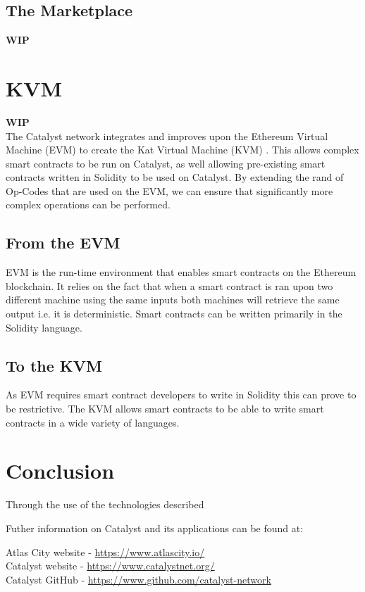 \documentclass{article}
\begin{document}
\subsection{The Marketplace}

\textbf{WIP} \\



\section{KVM}

\textbf{WIP} \\

The Catalyst network integrates and improves upon the Ethereum Virtual Machine (EVM) to create the Kat Virtual Machine (KVM) \cite{KVM}. This allows complex smart contracts to be run on Catalyst, as well allowing pre-existing smart contracts written in Solidity to be used on Catalyst. By extending the rand of Op-Codes that are used on the EVM, we can ensure that significantly more complex operations can be performed.

\subsection{From the EVM}

EVM is the run-time environment that enables smart contracts on the Ethereum blockchain. It relies on the fact that when a smart contract is ran upon two different machine using the same inputs both machines will retrieve the same output i.e. it is deterministic. Smart contracts can be written primarily in the Solidity language.

\subsection{To the KVM}

As EVM requires smart contract developers to write in Solidity this can prove to be restrictive. The KVM allows smart contracts to be able to write smart contracts in a wide variety of languages. 






\section*{Conclusion}

Through the use of the technologies described

Futher information on Catalyst and its applications can be found at: \\
\begin{center}
Atlas City website - \url{https://www.atlascity.io/} \\
Catalyst website - \url{https://www.catalystnet.org/}\\
Catalyst GitHub - \url{https://www.github.com/catalyst-network}\\
\end{center}





\end{document}

